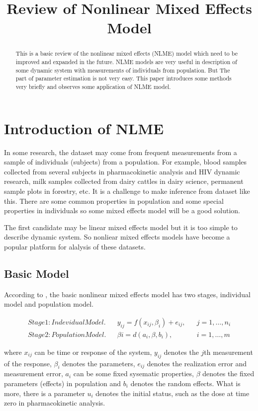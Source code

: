 \documentclass[12pt]{extarticle}
\title{Review of Nonlinear Mixed Effects Model}
\begin{document}
\maketitle
\begin{abstract}
This is a basic review of the nonlinear mixed effects (NLME) model which need to be improved and expanded in the future. NLME models are very useful in description of  some dynamic system with measurements of individuals from population. But The part of parameter estimation is not very easy. This paper introduces some methods very briefly and observes some application of NLME model.
\end{abstract}
\section{Introduction of NLME}
\label{sect:Introduction}
In some research, the dataset may come from frequent measurements from a sample of individuals (subjects) from a population. For example, blood samples collected from several subjects in pharmacokinetic analysis and HIV dynamic research, milk samples collected from dairy cattles in dairy science, permanent sample plots in forestry, etc. It is a challenge to make inference from dataset like this. There are some common properties in population and some special properties in individuals so some mixed effects model will be a good solution.

The first candidate may be linear mixed effects model but it is too simple to describe dynamic system. So nonliear mixed effects models have become a popular platform for alalysis of these datasets.

\subsection{Basic Model}
\label{sect:basic}
According to \cite{Davidian03}, the basic nonlinear mixed effects model has two stages, individual model and population model.

\begin{align}
Stage 1: Indevidual Model. & & y_{ij} = f(x_{ij},\beta_{i})+e_{ij}, & & j=1,\ldots,n_{i} \label{im1} \\
Stage 2: Population Model.  & & \beta{i} = d(a_{i},\beta,b_{i}), & & i=1,\ldots,m \label{pm1} 
\end{align}

where $x_{ij}$ can be time or response of the system, $y_{ij}$ denotes the $j$th measurement of the response, $\beta_{i}$ denotes the parameters, $e_{ij}$ denotes the realization error and measurement error, $a_{i}$ can be some fixed sysematic properties, $\beta$ denotes the fixed parameters (effects) in population and $b_{i}$ denotes the random effects. What is more, there is a parameter $u_i$ denotes the initial status, such as the dose at time zero in pharmacokinetic analysis.
\end{document}
